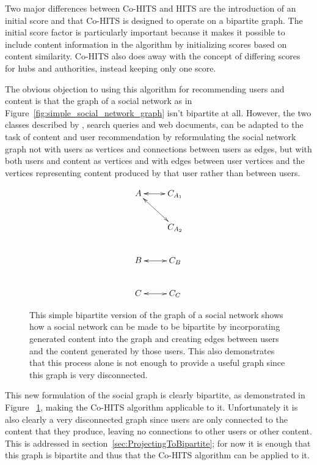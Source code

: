 Two major differences between Co-HITS and HITS are the introduction of an initial score and that Co-HITS is designed to operate on a bipartite graph. The initial score factor is particularly important because it makes it possible to include content information in the algorithm by initializing scores based on content similarity. Co-HITS also does away with the concept of differing scores for hubs and authorities, instead keeping only one score.

The obvious objection to using this algorithm for recommending users and content is that the graph of a social network as in Figure~\ref{fig:simple_social_network_graph} isn't bipartite at all. However, the two classes described by \cite{Deng2009}, search queries and web documents, can be adapted to the task of content and user recommendation by reformulating the social network graph not with users as vertices and connections between users as edges, but with both users and content as vertices and with edges between user vertices and the vertices representing content produced by that user rather than between users.

\begin{figure}
  \centering
\begin{displaymath}
  \xymatrix{
    A \ar@{<->}[r] \ar@{<->}[dr] & C_{A_{1}} \\
      &  C_{A_{2}} \\
    B \ar@{<->}[r] & C_{B} \\
    C \ar@{<->}[r] & C_{C} }
\end{displaymath} 
  \caption[Simple bipartite graph of a social network]{This simple bipartite version of the graph of a social network shows how a social network can be made to be bipartite by incorporating generated content into the graph and creating edges between users and the content generated by those users. This also demonstrates that this process alone is not enough to provide a useful graph since this graph is very disconnected.}
\label{fig:disconnected_bipartite_graph}
\end{figure}

This new formulation of the social graph is clearly bipartite, as demonstrated in Figure ~\ref{fig:disconnected_bipartite_graph}, making the Co-HITS algorithm applicable to it. Unfortunately it is also clearly a very disconnected graph since users are only connected to the content that they produce, leaving no connections to other users or other content. This is addressed in section~\ref{sec:ProjectingToBipartite}; for now it is enough that this graph is bipartite and thus that the Co-HITS algorithm can be applied to it.


